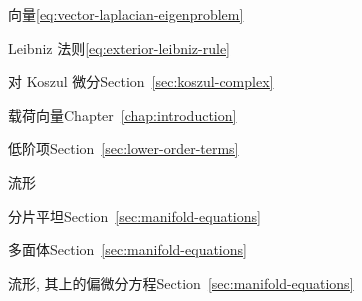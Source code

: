 \par\noindent\hspace*{1em}\label{index:laplacian-vector}{向量}\quad \eqref{eq:vector-laplacian-eigenproblem}

\par\noindent\hspace*{0em}\label{index:leibniz-rule}{Leibniz 法则}\quad \eqref{eq:exterior-leibniz-rule}

\par\noindent\hspace*{1em}\label{index:leibniz-rule-for-koszul-differential}{对 Koszul 微分}\quad Section~\ref{sec:koszul-complex}

\par\noindent\hspace*{0em}\label{index:load-vector}{载荷向量}\quad Chapter~\ref{chap:introduction}

\par\noindent\hspace*{0em}\label{index:lower-order-terms}{低阶项}\quad Section~\ref{sec:lower-order-terms}

\par\noindent\hspace*{0em}\label{index:manifold}{流形}

\par\noindent\hspace*{1em}\label{index:manifold-piecewise-flat}{分片平坦}\quad Section~\ref{sec:manifold-equations}

\par\noindent\hspace*{1em}\label{index:manifold-polyhedral}{多面体}\quad Section~\ref{sec:manifold-equations}

\par\noindent\hspace*{0em}\label{index:manifolds-pdes-on}{流形, 其上的偏微分方程}\quad Section~\ref{sec:manifold-equations}


